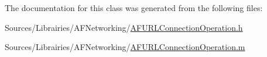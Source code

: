 The documentation for this class was generated from the following files\-:\begin{DoxyCompactItemize}
\item 
Sources/\-Librairies/\-A\-F\-Networking/\hyperlink{_a_f_u_r_l_connection_operation_8h}{A\-F\-U\-R\-L\-Connection\-Operation.\-h}\item 
Sources/\-Librairies/\-A\-F\-Networking/\hyperlink{_a_f_u_r_l_connection_operation_8m}{A\-F\-U\-R\-L\-Connection\-Operation.\-m}\end{DoxyCompactItemize}
